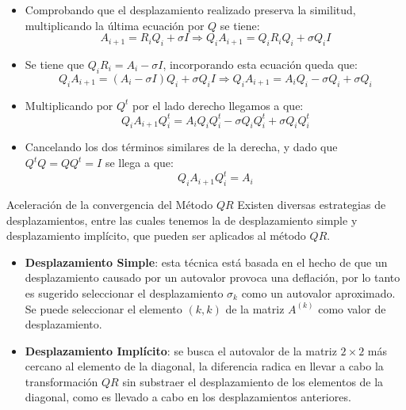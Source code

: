 \documentclass[11pt]{beamer}
\begin{document}
\begin{frame}
\begin{itemize}
   \item Comprobando que el desplazamiento realizado preserva la similitud, multiplicando la \'ultima ecuaci\'on por $Q$ se tiene:
$$
A_{i+1} = R_iQ_i + \sigma I \Rightarrow Q_i A_{i+1} = Q_i R_i Q_i + \sigma Q_iI
$$ 
 \item<2-> Se tiene que $Q_i R_i = A_i - \sigma I$, incorporando esta ecuaci\'on queda que:
$$
 Q_i A_{i+1} = (A_i - \sigma I)Q_i + \sigma Q_i I \Rightarrow Q_i A_{i+1} = A_i Q_i - \sigma Q_i + 
\sigma Q_i
$$ 
 \item<3-> Multiplicando por $Q^t$ por el lado derecho llegamos a que:
 $$
Q_i A_{i+1} Q^t_i = A_i Q_i Q^t_i - \sigma Q_i Q^t_i + \sigma Q_i Q^t_i
 $$
 \item<4-> Cancelando los dos t\'erminos similares de la derecha, y dado que $Q^tQ = QQ^t = I$
 se llega a que:
 $$
Q_iA_{i+1} Q^t_i = A_i
$$
\end{itemize}
\end{frame}
\begin{frame}{Aceleraci\'on de la convergencia del M\'etodo $QR$}
Existen diversas estrategias de desplazamientos, entre las cuales tenemos la de desplazamiento simple y desplazamiento impl\'icito, que pueden ser aplicados al m\'etodo $QR$.
\begin{itemize}
   \item<2-> {\bf Desplazamiento Simple}: esta t\'ecnica est\'a basada en el hecho de que un desplazamiento causado por un autovalor provoca una deflaci\'on, por lo tanto es sugerido seleccionar el desplazamiento $\sigma_k$ como un autovalor aproximado. Se puede seleccionar el elemento $(k, k)$ de la matriz $A^{(k)}$ como valor de desplazamiento.
\item<3-> {\bf Desplazamiento Impl\'icito}: se busca el autovalor de la matriz $2 \times 2$ m\'as 
cercano al elemento de la diagonal, la diferencia radica en llevar a cabo la transformaci\'on $QR$ 
sin substraer el desplazamiento de los elementos de la diagonal, como es llevado a cabo en los 
desplazamientos anteriores.
\end{itemize}
\end{frame}
\end{document}

